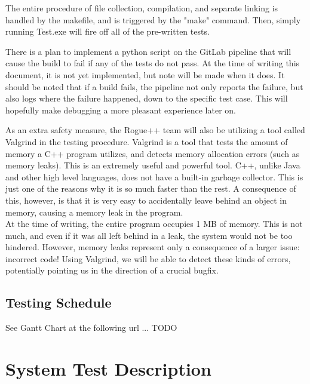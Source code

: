 \documentclass[12pt, titlepage]{article}
\begin{document}
	\bigskip

	The entire procedure of file collection, compilation, and separate linking is handled by the makefile, and is triggered by the "make" command. Then, simply running Test.exe will fire off all of the pre-written tests.

	\bigskip

	There is a plan to implement a python script on the GitLab pipeline that will cause the build to fail if any of the tests do not pass. At the time of writing this document, it is not yet implemented, but note will be made when it does. It should be noted that if a build fails, the pipeline not only reports the failure, but also logs where the failure happened, down to the specific test case. This will hopefully make debugging a more pleasant experience later on.

	\bigskip

	As an extra safety measure, the Rogue++ team will also be utilizing a tool called Valgrind in the testing procedure. Valgrind is a tool that tests the amount of memory a C++ program utilizes, and detects memory allocation errors (such as memory leaks). This is an extremely useful and powerful tool. C++, unlike Java and other high level languages, does not have a built-in garbage collector. This is just one of the reasons why it is so much faster than the rest. A consequence of this, however, is that it is very easy to accidentally leave behind an object in memory, causing a memory leak in the program.\\

	At the time of writing, the entire program occupies 1 MB of memory. This is not much, and even if it was all left behind in a leak, the system would not be too hindered. However, memory leaks represent only a consequence of a larger issue: incorrect code! Using Valgrind, we will be able to detect these kinds of errors, potentially pointing us in the direction of a crucial bugfix.

	\subsection{Testing Schedule}
		
	See Gantt Chart at the following url ... TODO

\newpage
\section{System Test Description}
\label{section3}
	
\end{document}
